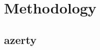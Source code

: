 \documentclass[../main.tex]{subfiles}
\begin{document}
\chapter{Methodology}

\section{azerty}

\lipsum[3]
\end{document}
